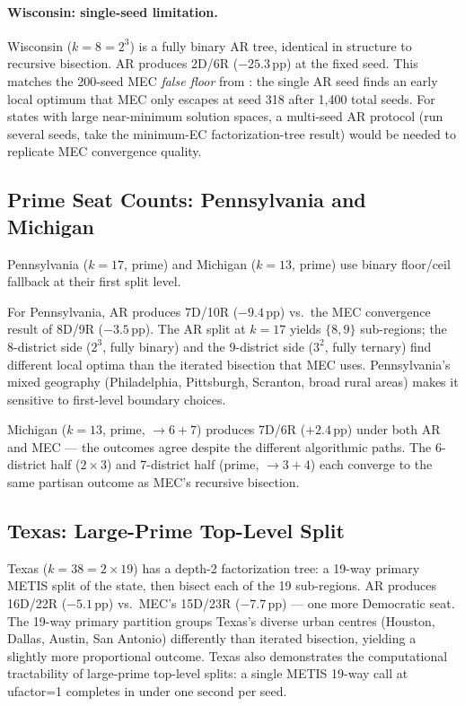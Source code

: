 \paragraph{Wisconsin: single-seed limitation.}
Wisconsin ($k = 8 = 2^3$) is a fully binary AR tree, identical in structure
to recursive bisection. AR produces 2D/6R ($-25.3$\,pp) at the fixed seed.
This matches the 200-seed MEC \emph{false floor} from \citet{dellaLibera2026mec}:
the single AR seed finds an early local optimum that MEC only escapes at seed
318 after 1{,}400 total seeds. For states with large near-minimum solution
spaces, a multi-seed AR protocol (run several seeds, take the minimum-EC
factorization-tree result) would be needed to replicate MEC convergence quality.

\subsection{Prime Seat Counts: Pennsylvania and Michigan}
\label{sec:eval:prime}

Pennsylvania ($k = 17$, prime) and Michigan ($k = 13$, prime) use binary
floor/ceil fallback at their first split level.

For Pennsylvania, AR produces 7D/10R ($-9.4$\,pp) vs.\ the MEC convergence
result of 8D/9R ($-3.5$\,pp). The AR split at $k=17$ yields $\{8, 9\}$
sub-regions; the 8-district side ($2^3$, fully binary) and the 9-district side
($3^2$, fully ternary) find different local optima than the iterated bisection
that MEC uses. Pennsylvania's mixed geography (Philadelphia, Pittsburgh, Scranton,
broad rural areas) makes it sensitive to first-level boundary choices.

Michigan ($k = 13$, prime, $\to 6+7$) produces 7D/6R ($+2.4$\,pp) under both
AR and MEC --- the outcomes agree despite the different algorithmic paths. The
6-district half ($2 \times 3$) and 7-district half (prime, $\to 3+4$) each
converge to the same partisan outcome as MEC's recursive bisection.

\subsection{Texas: Large-Prime Top-Level Split}
\label{sec:eval:texas}

Texas ($k = 38 = 2 \times 19$) has a depth-2 factorization tree: a 19-way
primary METIS split of the state, then bisect each of the 19 sub-regions.
AR produces 16D/22R ($-5.1$\,pp) vs.\ MEC's 15D/23R ($-7.7$\,pp) --- one
more Democratic seat. The 19-way primary partition groups Texas's diverse urban
centres (Houston, Dallas, Austin, San Antonio) differently than iterated
bisection, yielding a slightly more proportional outcome. Texas also demonstrates
the computational tractability of large-prime top-level splits: a single METIS
19-way call at ufactor=1 completes in under one second per seed.

